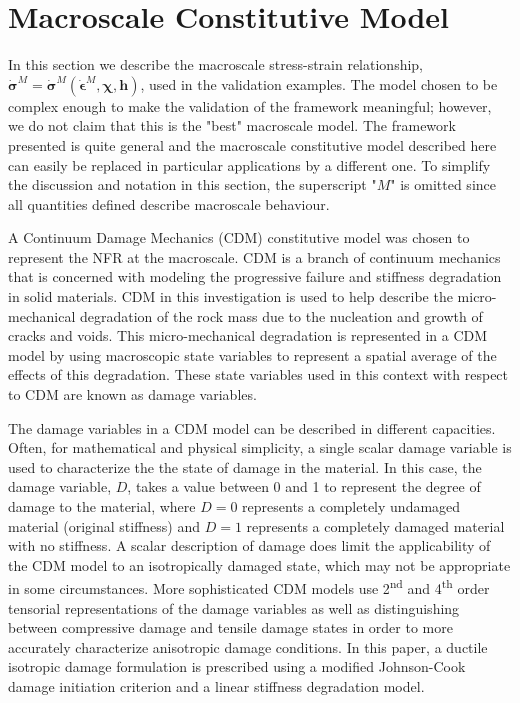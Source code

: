 \section{Macroscale Constitutive Model}

In this section we describe the macroscale stress-strain relationship, $\dot{\boldsymbol{\sigma}}^M=\dot{\boldsymbol{\sigma}}^M\left(\dot{\boldsymbol{\epsilon}}^M, \boldsymbol{\chi},\mathbf{h}\right)$, used in the validation examples. The model chosen to be complex enough to make the validation of the framework meaningful; however, we do not claim that this is the "best" macroscale model. The framework presented is quite general and the macroscale constitutive model described here can easily be replaced in particular applications by a different one. To simplify the discussion and notation in this section, the superscript "$M$" is omitted since all quantities defined describe macroscale behaviour.

A Continuum Damage Mechanics (CDM) constitutive model was chosen to represent the NFR at the macroscale. CDM is a branch of continuum mechanics that is concerned with modeling the progressive failure and stiffness degradation in solid materials. CDM in this investigation is used to help describe the micro-mechanical degradation of the rock mass due to the nucleation and growth of cracks and voids. This micro-mechanical degradation is represented in a CDM model by using macroscopic state variables to represent a spatial average of the effects of this degradation. These state variables used in this context with respect to CDM are known as damage variables. 

The damage variables in a CDM model can be described in different capacities. Often, for mathematical and physical simplicity, a single scalar damage variable is used to characterize the the state of damage in the material. In this case, the damage variable, $D$, takes a value between 0 and 1 to represent the degree of damage to the material, where $D=0$ represents a completely undamaged material (original stiffness) and $D=1$ represents a completely damaged material with no stiffness. A scalar description of damage does limit the applicability of the CDM model to an isotropically damaged state, which may not be appropriate in some circumstances. More sophisticated CDM models use 2\textsuperscript{nd} and 4\textsuperscript{th} order tensorial representations of the damage variables as well as distinguishing between compressive damage and tensile damage states in order to more accurately characterize anisotropic damage conditions. In this paper, a ductile isotropic damage formulation is prescribed using a modified Johnson-Cook damage initiation criterion and a linear stiffness degradation model.

